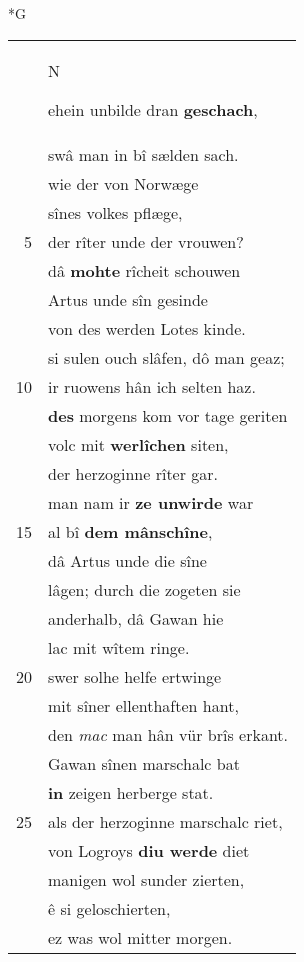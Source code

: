\documentclass[8pt,a4paper,notitlepage]{article}
\begin{document}
\begin{table}[ht]
\begin{minipage}[t]{0.5\linewidth}
\small
\begin{center}*G
\end{center}
\begin{tabular}{rl}
 & \begin{large}N\end{large}ehein unbilde dran \textbf{geschach},\\ 
 & swâ man in bî sælden sach.\\ 
 & wie der von Norwæge\\ 
 & sînes volkes pflæge,\\ 
5 & der rîter unde der vrouwen?\\ 
 & dâ \textbf{mohte} rîcheit schouwen\\ 
 & Artus unde sîn gesinde\\ 
 & von des werden Lotes kinde.\\ 
 & si sulen ouch slâfen, dô man geaz;\\ 
10 & ir ruowens hân ich selten haz.\\ 
 & \textbf{des} morgens kom vor tage geriten\\ 
 & volc mit \textbf{werlîchen} siten,\\ 
 & der herzoginne rîter gar.\\ 
 & man nam ir \textbf{ze unwirde} war\\ 
15 & al bî \textbf{dem mânschîne},\\ 
 & dâ Artus unde die sîne\\ 
 & lâgen; durch die zogeten sie\\ 
 & anderhalb, dâ Gawan hie\\ 
 & lac mit wîtem ringe.\\ 
20 & swer solhe helfe ertwinge\\ 
 & mit sîner ellenthaften hant,\\ 
 & den \textit{mac} man hân vür brîs erkant.\\ 
 & Gawan sînen marschalc bat\\ 
 & \textbf{in} zeigen herberge stat.\\ 
25 & als der herzoginne marschalc riet,\\ 
 & von Logroys \textbf{diu werde} diet\\ 
 & manigen  wol sunder zierten,\\ 
 & ê si geloschierten,\\ 
 & ez was wol mitter morgen.\\ 

\end{tabular}
\end{minipage}
\end{table}
\end{document}
